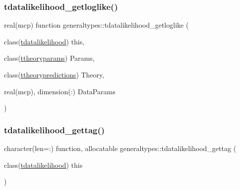 \mbox{\label{namespacegeneraltypes_a44032002cc7bece9f328a839b5830b5d}} 
\subsubsection{\texorpdfstring{tdatalikelihood\+\_\+getloglike()}{tdatalikelihood\_getloglike()}}
{\footnotesize\ttfamily real(mcp) function generaltypes\+::tdatalikelihood\+\_\+getloglike (\begin{DoxyParamCaption}\item[{class(\mbox{\hyperlink{structgeneraltypes_1_1tdatalikelihood}{tdatalikelihood}})}]{this,  }\item[{class(\mbox{\hyperlink{structgeneraltypes_1_1ttheoryparams}{ttheoryparams}})}]{Params,  }\item[{class(\mbox{\hyperlink{structgeneraltypes_1_1ttheorypredictions}{ttheorypredictions}})}]{Theory,  }\item[{real(mcp), dimension(\+:)}]{Data\+Params }\end{DoxyParamCaption})\hspace{0.3cm}{\ttfamily [private]}}

\mbox{\label{namespacegeneraltypes_a6578bd73fe17b7b10bb5740695d0fb5f}} 
\subsubsection{\texorpdfstring{tdatalikelihood\+\_\+gettag()}{tdatalikelihood\_gettag()}}
{\footnotesize\ttfamily character(len=\+:) function, allocatable generaltypes\+::tdatalikelihood\+\_\+gettag (\begin{DoxyParamCaption}\item[{class(\mbox{\hyperlink{structgeneraltypes_1_1tdatalikelihood}{tdatalikelihood}})}]{this }\end{DoxyParamCaption})\hspace{0.3cm}{\ttfamily [private]}}

\mbox{\label{namespacegeneraltypes_abae245dbb211bd2f44ed4267e47206de}} 
